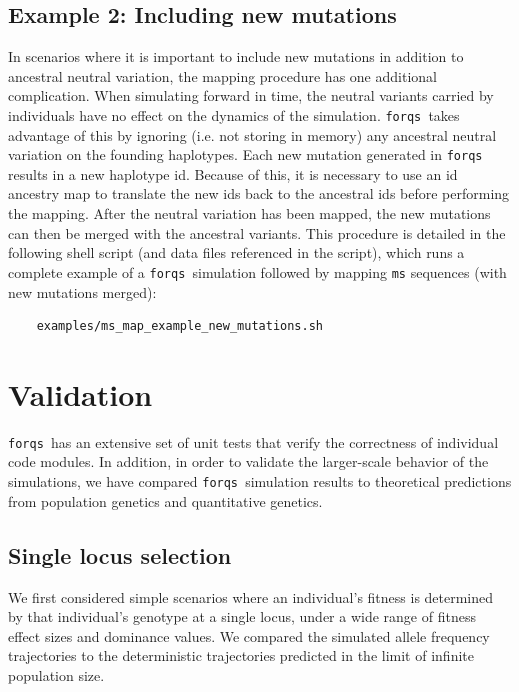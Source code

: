 \documentclass{article}
\newcommand{\forqs}[0]{\texttt{forqs }}
\begin{document}
\subsection{Example 2:  Including new mutations}

In scenarios where it is important to include new mutations in addition to
ancestral neutral variation, the mapping procedure has one additional
complication.  When simulating forward in time, the neutral variants carried by
individuals have no effect on the dynamics of the simulation.  \forqs takes
advantage of this by ignoring (i.e. not storing in memory) any ancestral
neutral variation on the founding haplotypes.  Each new mutation generated in
\forqs results in a new haplotype id.  Because of this, it is necessary to use
an id ancestry map to translate the new ids back to the ancestral ids before
performing the mapping.  After the neutral variation has been mapped, the new
mutations can then be merged with the ancestral variants.
This procedure is detailed in the following shell script (and data files
referenced in the script), which runs a complete example of a \forqs simulation
followed by mapping \texttt{ms} sequences (with new mutations merged):
\begin{small}
\begin{verbatim}
    examples/ms_map_example_new_mutations.sh
\end{verbatim}
\end{small}

\newpage


\section{Validation}

\forqs has an extensive set of unit tests that verify the correctness of
individual code modules.  In addition, in order to validate the larger-scale
behavior of the simulations, we have compared \forqs simulation results to
theoretical predictions from population genetics and quantitative genetics.


\subsection{Single locus selection}

We first considered simple scenarios where an individual's fitness is determined by 
that individual's genotype at a single locus, under a wide range of fitness effect
sizes and dominance values.  We compared the simulated allele frequency trajectories
to the deterministic trajectories predicted in the limit of infinite population size.
\end{document}
